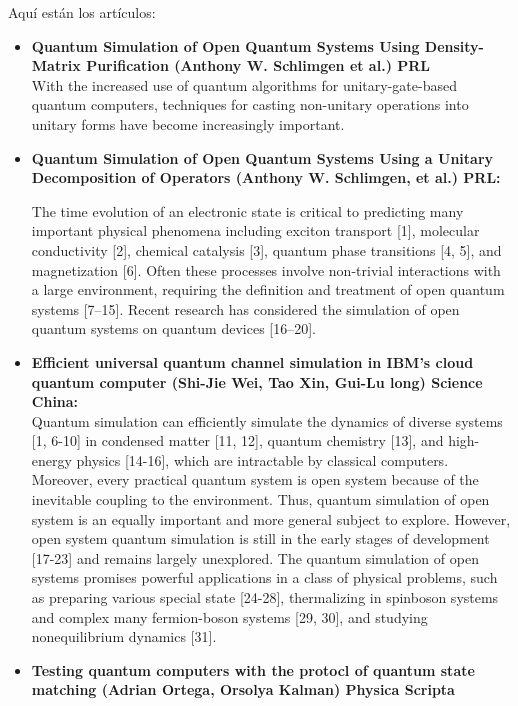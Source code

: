 \documentclass[10pt,letterpaper]{article} %
\begin{document}
Aquí están los artículos:

\begin{itemize}
\item \textbf{Quantum Simulation of Open Quantum Systems Using Density-Matrix Purification (Anthony W. Schlimgen et al.) PRL
} \\

With the increased
use of quantum algorithms for unitary-gate-based quantum
computers, techniques for casting non-unitary operations into
unitary forms have become increasingly important.


\item  \textbf{Quantum Simulation of Open Quantum Systems Using a Unitary Decomposition of Operators (Anthony W. Schlimgen, et al.) PRL:}


The time evolution of an electronic state is
critical to predicting many important physical phenomena
including exciton transport [1], molecular conductivity [2],
chemical catalysis [3], quantum phase transitions [4, 5], and
magnetization [6]. Often these processes involve non-trivial
interactions with a large environment, requiring the definition and treatment of open quantum systems [7–15]. Recent
research has considered the simulation of open quantum systems on quantum devices [16–20].

\item \textbf{Efficient universal quantum channel simulation in IBM's cloud quantum computer (Shi-Jie Wei, Tao Xin, Gui-Lu long) Science China:}\\ 

Quantum simulation can efficiently simulate the dynamics of diverse systems
[1, 6-10] in condensed matter [11, 12], quantum chemistry
[13], and high-energy physics [14-16], which are intractable
by classical computers. Moreover, every practical quantum
system is open system because of the inevitable coupling to
the environment. {\color{green} Thus, quantum simulation of open system
is an equally important and more general subject to explore.
However, open system quantum simulation is still in the
early stages of development [17-23] and remains largely unexplored. The quantum simulation of open systems promises
powerful applications in a class of physical problems, such as
preparing various special state [24-28], thermalizing in spinboson systems and complex many fermion-boson systems
[29, 30], and studying nonequilibrium dynamics [31].} \\

\item \textbf{Testing quantum computers with the protocl of quantum state matching (Adrian Ortega, Orsolya Kalman) Physica Scripta} \\


\end{itemize}
\end{document}
